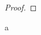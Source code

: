 \documentclass[uplatex, a4paper, 14Q, dvipdfmx]{jsarticle}
\begin{document}
\begin{proof}
  
\end{proof}

\begin{theorem}
  a
\end{theorem}







\end{document}
